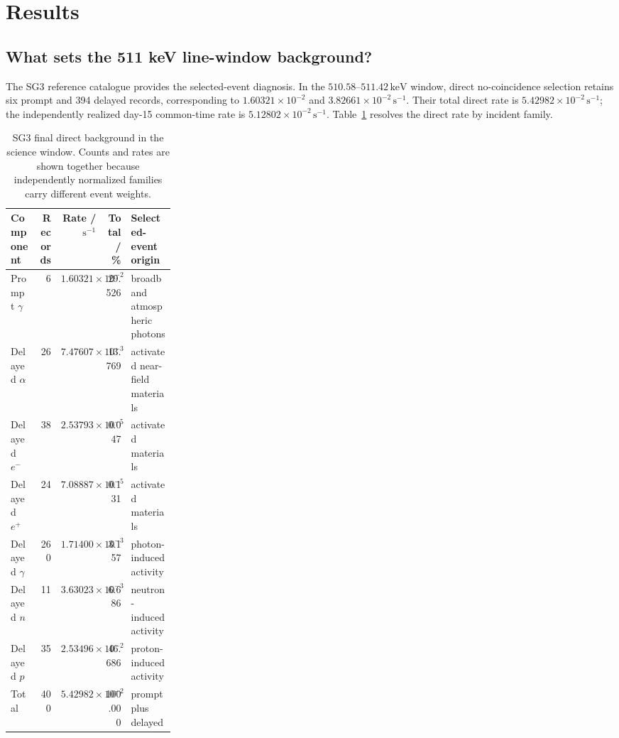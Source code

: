\documentclass[11pt]{article}
\newcommand{\keV}{\ensuremath{\,\mathrm{keV}}}
\newcommand{\cps}{\ensuremath{\,\mathrm{s^{-1}}}}
\begin{document}
\section{Results}
\label{sec:results}

\subsection{What sets the 511 keV line-window background?}
\label{subsec:reference_background_results}

The SG3 reference catalogue provides the selected-event diagnosis. In the
$510.58$--$511.42\keV$ window, direct no-coincidence selection retains six prompt
and 394 delayed records, corresponding to $1.60321\times10^{-2}$ and
$3.82661\times10^{-2}\cps$. Their total direct rate is
$5.42982\times10^{-2}\cps$; the independently realized day-15 common-time rate is
$5.12802\times10^{-2}\cps$. Table~\ref{tab:reference_background_budget} resolves
the direct rate by incident family.

\begin{table}[t]
\centering
\caption{SG3 final direct background in the science window. Counts and rates are
shown together because independently normalized families carry different event
weights.}
\label{tab:reference_background_budget}
\footnotesize
\begin{tabular}{lrrrp{0.27\linewidth}}
\toprule
Component & Records & Rate / $\cps$ & Total / \% & Selected-event origin \\
\midrule
Prompt $\gamma$ & 6 & $1.60321\times10^{-2}$ & 29.526 & broadband atmospheric photons \\
Delayed $\alpha$ & 26 & $7.47607\times10^{-3}$ & 13.769 & activated near-field materials \\
Delayed $e^-$ & 38 & $2.53793\times10^{-5}$ & 0.047 & activated materials \\
Delayed $e^+$ & 24 & $7.08887\times10^{-5}$ & 0.131 & activated materials \\
Delayed $\gamma$ & 260 & $1.71400\times10^{-3}$ & 3.157 & photon-induced activity \\
Delayed $n$ & 11 & $3.63023\times10^{-3}$ & 6.686 & neutron-induced activity \\
Delayed $p$ & 35 & $2.53496\times10^{-2}$ & 46.686 & proton-induced activity \\
\midrule
Total & 400 & $5.42982\times10^{-2}$ & 100.000 & prompt plus delayed \\
\bottomrule
\end{tabular}
\end{table}
\end{document}

